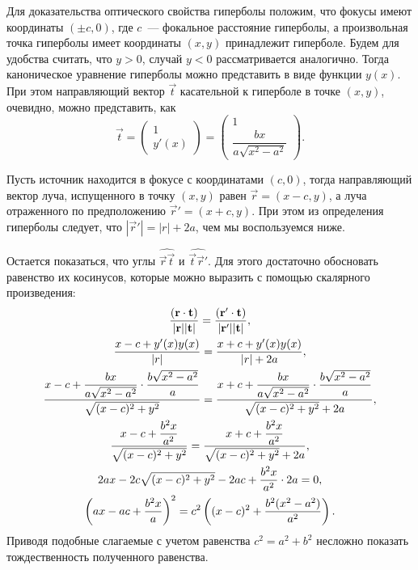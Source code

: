 Для доказательства оптического свойства гиперболы положим, что фокусы имеют координаты $(\pm c, 0)$, где $c$~--- фокальное расстояние гиперболы, а произвольная точка гиперболы имеет координаты $(x, y)$ принадлежит гиперболе. Будем для удобства считать, что $y > 0$, случай $y < 0$ рассматривается аналогично. Тогда каноническое уравнение гиперболы можно представить в виде функции $y(x)$. При этом направляющий вектор $\vec t$ касательной к гиперболе в точке $(x, y)$, очевидно, можно представить, как
\begin{equation*}
    \vec t =
    \begin{pmatrix}
        1\\
        y'(x)
    \end{pmatrix} =
    \begin{pmatrix}
        1\\
        \dfrac{bx}{a \sqrt{x^2 - a^2}}
    \end{pmatrix}.
\end{equation*}

Пусть источник находится в фокусе с координатами $(c, 0)$, тогда направляющий вектор луча, испущенного в точку $(x, y)$ равен $\vec r = (x - c, y)$, а луча отраженного по предположению $\vec r' = (x + c, y)$. При этом из определения гиперболы следует, что $|\vec r'| = |r| + 2a$, чем мы воспользуемся ниже. 

Остается показаться, что углы $\widehat{\vec r \vec t}$ и $\widehat{\vec t \vec r'}$. Для этого достаточно обосновать равенство их косинусов, которые можно выразить с помощью скалярного произведения:
\begin{gather*}
    \frac{ \left(\mathbf{r} \cdot \mathbf{t}\right)}{|\mathbf{r}| | \mathbf{t} |} = \frac{ \left(\mathbf{r'} \cdot \mathbf{t}\right)}{|\mathbf{r}'| | \mathbf{t} |},\\
    \frac{ x - c + y'(x)y(x)}{|r|} = \frac{x + c + y'(x) y(x)}{|r| + 2a},\\
    \frac{ x - c + \dfrac{bx}{a \sqrt{x^2-a^2}} \cdot \dfrac{b\sqrt{x^2 - a^2}}{a}}{\sqrt{(x - c)^2 + y^2}} = \frac{ x + c + \dfrac{bx}{a \sqrt{x^2-a^2}} \cdot \dfrac{b\sqrt{x^2 - a^2}}{a}}{\sqrt{(x - c)^2 + y^2} + 2a},\\
    \frac{ x - c + \dfrac{b^2 x }{a^2}}{\sqrt{(x - c)^2 + y^2}} = \frac{ x + c + \dfrac{b^2 x }{a^2}}{\sqrt{(x - c)^2 + y^2} + 2a},\\
    2ax - 2c\sqrt{(x - c )^2 + y^2} - 2ac + \frac{b^2 x}{a^2} \cdot 2a = 0,\\
    \left( ax - ac + \frac{b^2 x}{a} \right)^2 = c^2 \left( (x-c)^2 + \frac{b^2 (x^2 - a^2)}{a^2} \right).
\end{gather*}
Приводя подобные слагаемые с учетом равенства $c^2 = a^2 + b^2$ несложно показать тождественность полученного равенства.

